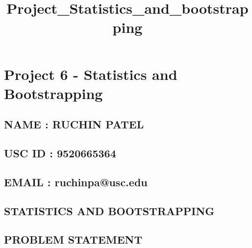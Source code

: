 \documentclass[11pt]{article}
\title{Project\_Statistics\_and\_bootstrapping}
\begin{document}
    
    
    \maketitle
    
    

    
    \section{Project 6 - Statistics and
Bootstrapping}\label{project-6---statistics-and-bootstrapping}

    \subsection{NAME : RUCHIN PATEL}\label{name-ruchin-patel}

\subsection{USC ID : 9520665364}\label{usc-id-9520665364}

\subsection{EMAIL : ruchinpa@usc.edu}\label{email-ruchinpausc.edu}

    \subsection{STATISTICS AND
BOOTSTRAPPING}\label{statistics-and-bootstrapping}

\subsection{PROBLEM STATEMENT}\label{problem-statement}
\end{document}
